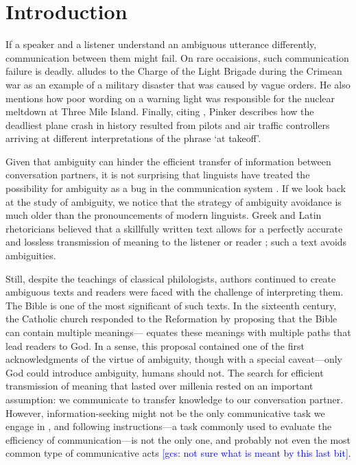 \documentclass[10pt,a4paper]{article}
\newcommand{\gcs}[1]{\textcolor{blue}{[gcs: #1]}}
\begin{document}
\section{Introduction}

If a speaker and a listener understand an ambiguous utterance differently, communication between them might fail. On rare occaisions, such communication failure is deadly.  alludes to the Charge of the Light Brigade during the Crimean war as an example of a military disaster that was caused by vague orders. He also mentions how poor wording on a warning light was responsible for the nuclear meltdown at Three Mile Island. Finally, citing , Pinker describes how the deadliest plane crash in history resulted from pilots and air traffic controllers arriving at different interpretations of the phrase `at takeoff'.

Given that ambiguity can hinder the efficient transfer of information between conversation partners, it is not surprising that linguists have treated the possibility for ambiguity as a bug in the communication system \cite{grice1975,chomsky2002minimalism}.
If we look back at the study of ambiguity, we notice that the strategy of ambiguity avoidance is much older than the pronouncements of modern linguists. 
Greek and Latin rhetoricians believed that a skillfully written text allows for a perfectly accurate and lossless transmission of meaning to the listener or reader \cite{ossarichardson2019}; such a text avoids ambiguities.

Still, despite the teachings of classical philologists, authors continued to  create ambiguous texts and readers were faced with the challenge of interpreting them. The Bible is one of the most significant of such texts. In the sixteenth century, the Catholic church responded to the Reformation by proposing that the Bible can contain multiple meanings--- equates these meanings with multiple paths that lead readers to God. In a sense, this proposal contained one of the first acknowledgments of the virtue of ambiguity, though with a  special caveat---only God could introduce ambiguity, humans should not. The search for efficient transmission of meaning that lasted over millenia rested on an important assumption: we communicate to transfer knowledge to our conversation partner. However, information-seeking might not be the only communicative task we engage in \cite{markova1995preface}, and following instructions---a task commonly used to evaluate the efficiency of communication---is not the only one, and probably not even the most common type of communicative acts \cite{foppa1995mutual} \gcs{not sure what is meant by this last bit}. 
\end{document}
